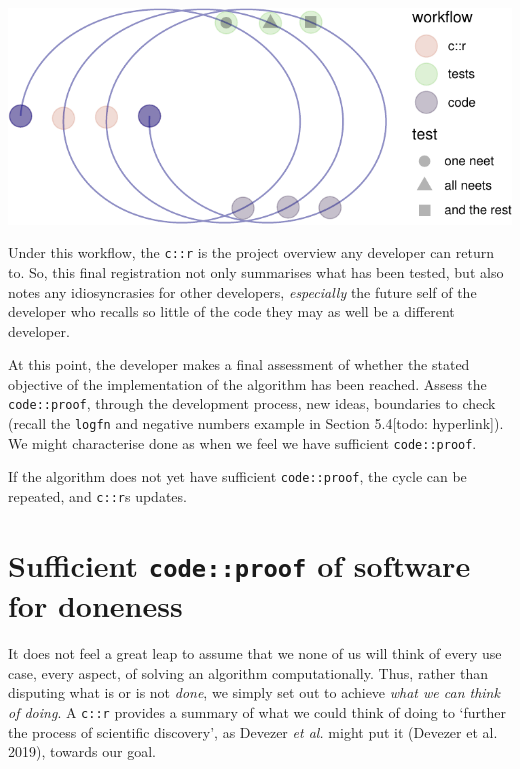 \documentclass[
]{article}
\begin{document}
\begin{center}\includegraphics{when-is-done-done_files/figure-latex/unnamed-chunk-11-1} \end{center}

Under this workflow, the \texttt{c::r} is the project overview any developer can return to. So, this final registration not only summarises what has been tested, but also notes any idiosyncrasies for other developers, \emph{especially} the future self of the developer who recalls so little of the code they may as well be a different developer.

At this point, the developer makes a final assessment of whether the stated objective of the implementation of the algorithm has been reached. Assess the \texttt{code::proof}, through the development process, new ideas, boundaries to check (recall the \texttt{logfn} and negative numbers example in Section 5.4{[}todo: hyperlink{]}). We might characterise done as when we feel we have sufficient \texttt{code::proof}.

If the algorithm does not yet have sufficient \texttt{code::proof}, the cycle can be repeated, and \texttt{c::r}s updates.

\hypertarget{sufficient-codeproof-of-software-for-doneness}{%
\section{\texorpdfstring{Sufficient \texttt{code::proof} of software for doneness}{Sufficient code::proof of software for doneness}}\label{sufficient-codeproof-of-software-for-doneness}}

It does not feel a great leap to assume that we none of us will think of every use case, every aspect, of solving an algorithm computationally. Thus, rather than disputing what is or is not \emph{done}, we simply set out to achieve \emph{what we can think of doing}. A \texttt{c::r} provides a summary of what we could think of doing to `further the process of scientific discovery', as Devezer \emph{et al.} might put it (Devezer et al. 2019), towards our goal.
\end{document}
